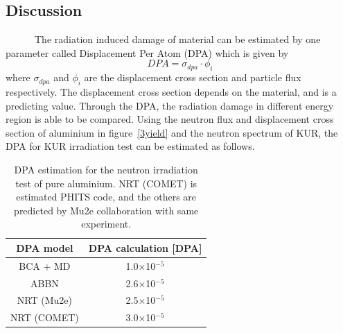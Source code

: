  \subsection{Discussion}
~~~~~~The radiation induced damage of material can be estimated by one parameter called Displacement Per Atom (DPA) which is given by
\begin{equation}
 DPA = \sigma_{dpa} \cdot \phi_i
\end{equation}
where $\sigma_{dpa}$ and $\phi_i$ are the displacement cross section and particle flux respectively.
The displacement cross section depends on the material, and is a predicting value.
Through the DPA, the radiation damage in different energy region is able to be compared.
Using the neutron flux and displacement cross section of aluminium in figure~\ref{3yield} and the neutron spectrum of KUR, the DPA for KUR irradiation test can be estimated as follows.
\begin{table}[H]
 \centering
 \begin{tabular}{cc} \hline \hline
  DPA model & DPA calculation [DPA] \\ \hline
  BCA + MD & 1.0$\times$10$^{-5}$ \\
  ABBN & 2.6$\times$10$^{-5}$ \\
  NRT (Mu2e) & 2.5$\times$10$^{-5}$ \\
  NRT (COMET) & 3.0$\times$10$^{-5}$ \\ \hline \hline
 \end{tabular}
 \caption{DPA estimation for the neutron irradiation test of pure aluminium. NRT (COMET) is estimated PHITS code, and the others are predicted by Mu2e collaboration with same experiment.}
\end{table}
